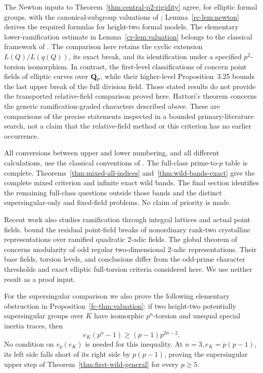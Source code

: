 The Newton inputs to Theorem~\ref{thm:central-p2-rigidity} agree, for elliptic formal groups, with the canonical-subgroup valuations of \citet[Theorem~4.4 and Corollaries~4.5--4.6]{Smith2023}; Lemma~\ref{rc-lem:newton} derives the required formulas for height-two formal models. The elementary lower-ramification estimate in Lemma~\ref{cr-lem:valuation} belongs to the classical framework of \citet[Chapter~IV, \S1]{Serre1979}. The comparison here retains the cyclic extension $L(Q)/L(q(Q))$, its exact break, and its identification under a specified $p^2$-torsion isomorphism. In contrast, the first-level classifications of \citet[\S\S2.1, 2.3]{OzekiYoshida2026} concern point fields of elliptic curves over $\mathbf Q_p$, while their higher-level Proposition~3.25 bounds the last upper break of the full division field. Those stated results do not provide the transported relative-field comparison proved here. Hattori's theorem concerns the generic ramification-graded characters described above. These are comparisons of the precise statements inspected in a bounded primary-literature search, not a claim that the relative-field method or this criterion has no earlier occurrence.

All conversions between upper and lower numbering, and all different calculations, use the classical conventions of \citet[Chapters~III--IV]{Serre1979}. The full-class prime-to-$p$ table is complete. Theorems~\ref{thm:mixed-all-indices} and~\ref{thm:wild-bands-exact} give the complete mixed criterion and infinite exact wild bands. The final section identifies the remaining full-class questions outside those bands and the distinct supersingular-only and fixed-field problems. No claim of priority is made.

Recent work also studies ramification through integral lattices and actual point fields. \citet[Theorem~11.13, p.~43]{DembeleEtAl2026} bound the residual point-field breaks of nonordinary rank-two crystalline representations over ramified quadratic $2$-adic fields. The global theorem of \citet[Theorem~1.1, p.~1]{OpenAI2026} concerns modularity of odd regular two-dimensional $2$-adic representations. Their base fields, torsion levels, and conclusions differ from the odd-prime character thresholds and exact elliptic full-torsion criteria considered here. We use neither result as a proof input.

For the supersingular comparison we also prove the following elementary obstruction in Proposition~\ref{fc-thm:valuation}: if two height-two potentially supersingular groups over \(K\) have isomorphic \(p^n\)-torsion and unequal special inertia traces, then
\[
e_K(p^n-1)\geq(p-1)p^{2n-2}.
\]
No condition on \(v_p(e_K)\) is needed for this inequality. At \(n=3,e_K=p(p-1)\), its left side falls short of its right side by \(p(p-1)\), proving the supersingular upper step of Theorem~\ref{thm:first-wild-general} for every \(p\ge5\).
